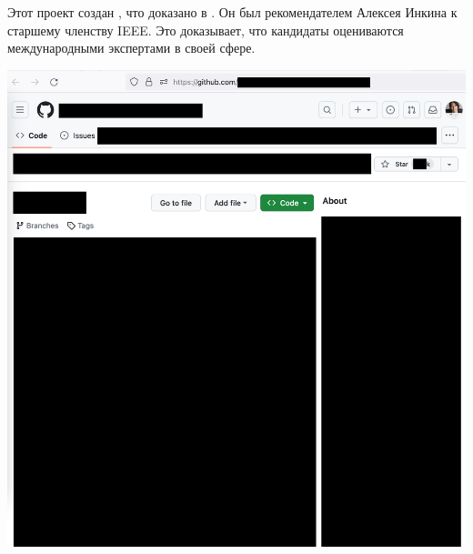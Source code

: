 
Этот проект создан \MrIeeeReferenceOne, что доказано в .
Он был рекомендателем Алексея Инкина к старшему членству IEEE.
Это доказывает, что кандидаты оцениваются международными экспертами в своей сфере.

\includegraphics[width=\textwidth]{ieee-reference-one-project-two-stars_public}

\pagebreak
